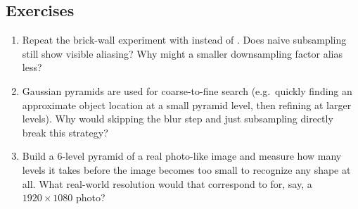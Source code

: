 \subsection*{Exercises}
\begin{enumerate}
  \item Repeat the brick-wall experiment with  instead of . Does naive subsampling still show visible aliasing? Why might a smaller downsampling factor alias less?
  \item Gaussian pyramids are used for coarse-to-fine search (e.g.\ quickly finding an approximate object location at a small pyramid level, then refining at larger levels). Why would skipping the blur step and just subsampling directly break this strategy?
  \item Build a 6-level pyramid of a real photo-like image and measure how many levels it takes before the image becomes too small to recognize any shape at all. What real-world resolution would that correspond to for, say, a $1920\times1080$ photo?
\end{enumerate}

\vfill
{}
